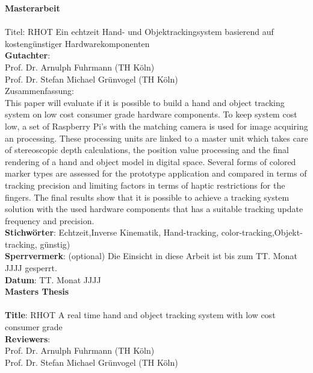 \begin{titlepage}
\begin{figure}[!ht]
\begin{flushright}
\end{flushright}
\end{figure}
\newpage
\setcounter{page}{1}
\huge\textbf{Masterarbeit}\\\\
\large
Titel: RHOT Ein echtzeit Hand- und Objektrackingsystem basierend auf kostengünstiger Hardwarekomponenten\\
\textbf{Gutachter}:\\
	Prof. Dr. Arnulph Fuhrmann (TH Köln)\\
	Prof. Dr. Stefan Michael Grünvogel (TH Köln)\\
Zusammenfassung:\\ This paper will evaluate if it is possible to build a hand and object tracking system on low cost consumer grade hardware components. To keep system cost low, a set of Raspberry Pi's with the matching camera is used for image acquiring an processing. These processing units are linked to a master unit which takes care of stereoscopic depth calculations, the position value processing and the final rendering of a hand and object model in digital space. Several forms of colored marker types are assessed for the prototype application and compared in terms of tracking precision and limiting factors in terms of haptic restrictions for the fingers. The final results show that it is possible to achieve a tracking system solution with the used hardware components that has a suitable tracking update frequency and precision.\\
\textbf{Stichwörter}: Echtzeit,Inverse Kinematik, Hand-tracking, color-tracking,Objekt-tracking, günstig)\\
\textbf{Sperrvermerk}: (optional) Die Einsicht in diese Arbeit ist bis zum TT. Monat JJJJ gesperrt.\\
\textbf{Datum}: TT. Monat JJJJ\\
\newpage
\huge \textbf{Masters Thesis}\\\\
\large
\textbf{Title}: RHOT A real time hand and object tracking system with low cost consumer grade\\
\textbf{Reviewers}:\\
	Prof. Dr. Arnulph Fuhrmann (TH Köln)\\
	Prof. Dr. Stefan Michael Grünvogel (TH Köln)\\

\end{titlepage}
